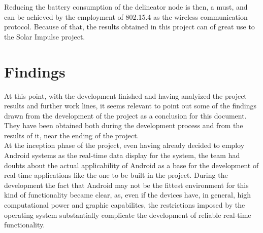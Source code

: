 \begin{itemize}
				Reducing the battery consumption of the delineator node is then, a must, and can be achieved by
				the employment of 802.15.4 as the wireless communication protocol. Because of that, the results
				obtained in this project can of great use to the Solar Impulse project.\\
	
		\end{itemize}
	
	\section{Findings}
	\label{sec:end-findings}

		At this point, with the development finished and having analyized the project results and further work lines, it seems relevant to point out some of the findings drawn from the development of the project as a conclusion for this document. They have been obtained both during the development process and from the results of it, near the ending of the project.\\
		
		At the inception phase of the project, even having already decided to employ Android systems as the real-time data display for the system, the team had doubts about the actual applicability of Android as a base for the development of real-time applications like the one to be built in the project. During the development the fact that Android may not be the fittest environment for this kind of functionality became clear, as, even if the devices have, in general, high computational power and graphic capabilites, the restrictions imposed by the operating system substantially complicate the development of reliable real-time functionality.\\

